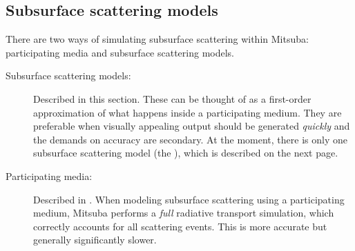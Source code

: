 \newpage
\subsection{Subsurface scattering models}
\label{sec:subsurface}
There are two ways of simulating subsurface scattering within Mitsuba:
participating media and subsurface scattering models.

\begin{description}
  \item[Subsurface scattering models:] Described in this section. These can be thought
    of as a first-order approximation of what happens inside a participating medium.
    They are preferable when visually appealing output should be generated
    \emph{quickly} and the demands on accuracy are secondary.
    At the moment, there is only one subsurface scattering model (the
    ), which is described on the next page.
  \item[Participating media:] Described in . When modeling
    subsurface scattering using a participating medium, Mitsuba performs a \emph{full}
    radiative transport simulation, which correctly accounts for all scattering events.
    This is more accurate but generally significantly slower.
\end{description}

